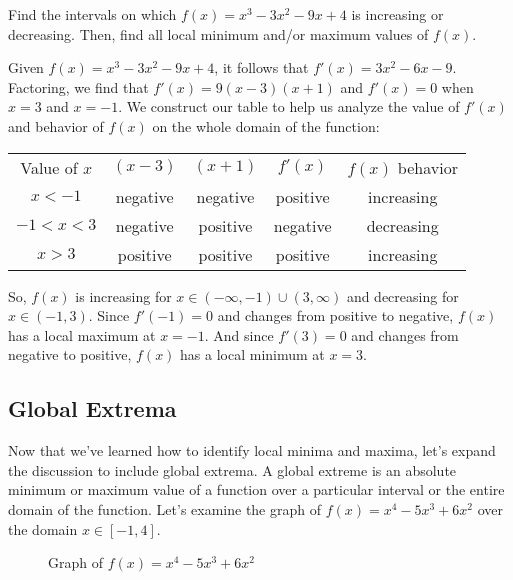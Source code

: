 \begin{Exercise}[label=locext1]
Find the intervals on which $f(x)=x^3-3x^2-9x+4$ is increasing or decreasing. Then, find all local minimum and/or maximum values of $f(x)$. 
\end{Exercise}

\begin{Answer}[ref=locext1]
Given $f(x)=x^3-3x^2-9x+4$, it follows that $f'(x)=3x^2-6x-9$. Factoring, we find that $f'(x) = 9(x-3)(x+1)$ and $f'(x) = 0$ when $x=3$ and $x=-1$. We construct our table to help us analyze the value of $f'(x)$ and behavior of $f(x)$ on the whole domain of the function:
\begin{center}
	\begin{tabular}{c|c|c|c|c}
		Value of $x$ & $(x-3)$ & $(x+1)$ & $f'(x)$ & $f(x)$ behavior\\
		$x<-1$ & negative & negative & positive & increasing\\
		$-1<x<3$ & negative & positive & negative & decreasing\\
		$x>3$ & positive & positive & positive & increasing
	\end{tabular}
\end{center}
So, $f(x)$ is increasing for $x \in (-\infty, -1) \cup (3, \infty)$ and decreasing for $x \in (-1, 3)$. Since $f'(-1)=0$ and changes from positive to negative, $f(x)$ has a local maximum at $x=-1$. And since $f'(3)=0$ and changes from negative to positive, $f(x)$ has a local minimum at $x=3$.
\end{Answer}



\subsection{Global Extrema}
Now that we've learned how to identify local minima and maxima, let's expand the discussion to include global extrema. A global extreme is an absolute minimum or maximum value of a function over a particular interval or the entire domain of the function. Let's examine the graph of $f(x) = x^4-5x^3+6x^2$ over the domain $x \in [-1,4]$.

\begin{figure}[htbp]
  \centering
  \caption{Graph of \( f(x) = x^4-5x^3+6x^2 \) }
  \label{fig:globalext}
\end{figure}


